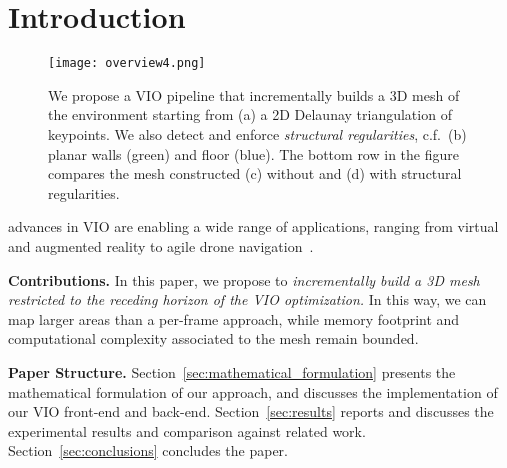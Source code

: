 
\section{Introduction}
\label{sec:introduction}

\begin{figure}[t]
  \centering
  \texttt{[image: overview4.png]}
  \caption{We propose a VIO pipeline that incrementally builds a 3D mesh of the environment starting from (a) a 2D Delaunay triangulation of keypoints. We also detect and enforce \emph{structural regularities}, c.f.~(b) planar walls (green) and floor (blue). The bottom row in the figure compares the mesh constructed
  (c) without and (d) with structural regularities.\vspace{-5mm}}
  \label{fig:intro}
\end{figure}

  advances in VIO are enabling a wide range of applications, ranging from
 virtual and augmented reality to agile drone navigation~\cite{SayreMcCord18icra}.

{\bf Contributions.}
In this paper, we propose to \emph{incrementally build a 3D mesh restricted to the receding horizon of the VIO optimization.}
In this way, we can map larger areas than a per-frame approach, while memory footprint and computational complexity associated to the mesh remain bounded.

{\bf Paper Structure.}
Section~\ref{sec:mathematical_formulation} presents the mathematical formulation of our approach, and discusses the implementation of %
our VIO front-end and back-end. %
Section~\ref{sec:results} reports and discusses the experimental results and comparison against related work. Section~\ref{sec:conclusions} concludes the paper.